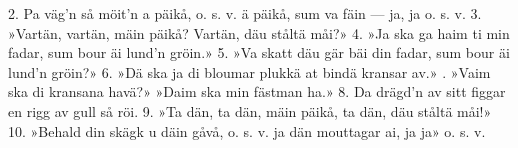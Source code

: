 \setlength{\columnsep}{0.5cm}
\begin{multicols}{2}
2.  Pa väg’n så möit’n a päikå, o. s. v.
    ä päikå, sum va fäin — ja, ja o. s. v.
3.  »Vartän, vartän, mäin päikå?
    Vartän, däu ståltä måi?»
4.  »Ja ska ga haim ti min fadar,
    sum bour äi lund’n gröin.»
5.  »Va skatt däu gär bäi din fadar,
    sum bour äi lund’n gröin?»
6.  »Dä ska ja di bloumar plukkä
    at bindä kransar av.»
\vfill{}.  »Vaim ska di kransana havä?»
    »Daim ska min fästman ha.»
8.  Da drägd’n av sitt figgar
    en rigg av gull så röi.
9.  »Ta dän, ta dän, mäin päikå,
    ta dän, däu ståltä måi!»
10. »Behald din skägk u däin gåvå, o. s. v.
    ja dän mouttagar ai, ja ja» o. s. v.
\end{multicols}
